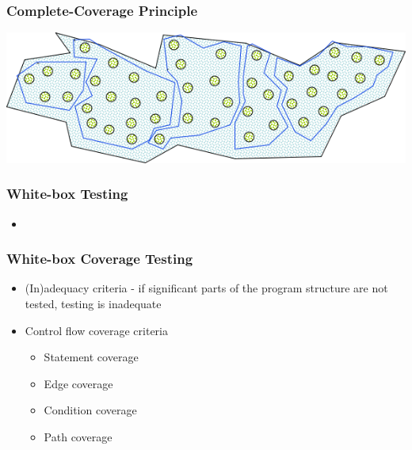 \documentclass[t,12pt,numbers,fleqn]{beamer}
\begin{document}

\begin{frame}
\frametitle{Complete-Coverage Principle}

\includegraphics[scale=0.5]{../Figures/CompleteCoveragePrinciple.png}

\end{frame}


\begin{frame}
\frametitle{White-box Testing}

\begin{itemize}
\item {}
\end{itemize}

\end{frame}


\begin{frame}
\frametitle{White-box Coverage Testing}

\begin{itemize}
\item (In)adequacy criteria - if significant parts of the program structure are not tested, testing is inadequate
\item Control flow coverage criteria
\begin{itemize}
\item Statement coverage
\item Edge coverage
\item Condition coverage
\item Path coverage
\end{itemize}
\end{itemize}

\end{frame}
\end{document}

